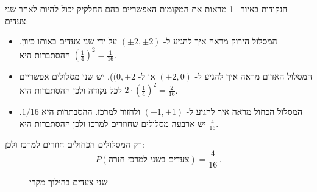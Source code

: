 הנקודות באיור%
~\ref{f.two-moves}
מראות את המקומות האפשריים בהם החלקיק יכול להיות לאחר שני צעדים:
\begin{itemize}
\item
המסלול הירוק מראה איך להגיע ל-%
$(\pm 2, \pm 2)$
על ידי שני צעדים באותו כיוון. ההסתברות היא
$\left(\frac{1}{4}\right)^2= \frac{1}{16}$.
\item
המסלול האדום מראה איך להגיע ל-%
$(\pm 2,0)$
או ל-%
$(0,\pm 2$).
יש שני מסלולים אפשריים לכל נקודה ולכן ההסתברות היא
$2\cdot\left(\frac{1}{4}\right)^2= \frac{2}{16}$.
\item
המסלול הכחול מראה איך להגיע ל-%
$(\pm 1,\pm 1)$
ולחזור למרכז. ההסבתרות היא
$1/16$.
יש ארבעה מסלולים שחוזרים למרכז ולכן ההסתברות היא
$\frac{4}{16}$.
\end{itemize}
רק המסלולים הכחולים חוזרים למרכז ולכן:
\[
P(\textrm{צעדים בשני למרכז חזרה})=\frac{4}{16}\,.
\]

\begin{figure}[tb]
\begin{center}
\end{center}
\caption{שני צעדים בהילוך מקרי}\label{f.two-moves}
\end{figure}

